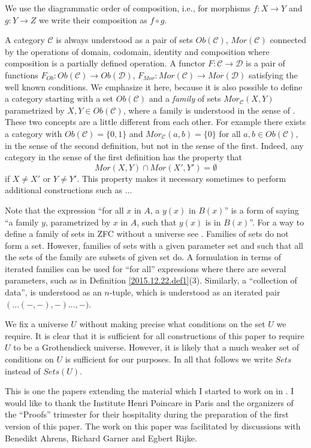 \documentclass[12pt]{amsart}
\newcommand{\sr}{\rightarrow}
\newcommand{\C}{{\mathcal C}}
\newcommand{\D}{{\mathcal D}}
\begin{document}
We use the diagrammatic order of composition, i.e., for morphisms $f:X\sr Y$
and $g:Y\sr Z$ we write their composition as $f\circ g$.

A category $\C$ is always understood as a pair of sets $Ob(\C)$, $Mor(\C)$
connected by the operations of domain, codomain, identity and composition where
composition is a partially defined operation. A functor $F:\C\sr \D$ is a pair
of functions $F_{Ob}:Ob(\C)\sr Ob(\D)$, $F_{Mor}:Mor(\C)\sr Mor(\D)$ satisfying
the well known conditions. We emphasize it here, because it is also possible to
define a category starting with a set $Ob(\C)$ and a {\em family} of sets
$Mor_{\C}(X,Y)$ parametrized by $X,Y\in Ob(\C)$, where a {family} is understood
in the sense of \cite[Remark 3.9]{fromunivwithPiI}. These two concepts are a
little different from each other. For example there exists a category with
$Ob(\C)=\{0,1\}$ and $Mor_{\C}(a,b)=\{0\}$ for all $a,b\in Ob(\C)$, in the
sense of the second definition, but not in the sense of the first. Indeed, any
category in the sense of the first definition has the property that
%
$$Mor(X,Y)\cap Mor(X',Y')=\emptyset$$
%
if $X\ne X'$ or $Y\ne Y'$. This property makes it necessary sometimes to
perform additional constructions such as ...

Note that the expression ``for all $x$ in $A$, a $y(x)$ in $B(x)$'' is a form
of saying ``a family $y$, parametrized by $x$ in $A$, such that $y(x)$ is in
$B(x)$''. For a way to define a family of sets in ZFC without a universe
see \cite[Remark 3.9]{fromunivwithPiI}. Families of sets do not form a
set. However, families of sets with a given parameter set and such that all the
sets of the family are subsets of given set do. A formulation in terms of
iterated families can be used for ``for all'' expressions where there are
several parameters, such as in Definition \ref{2015.12.22.def1}(3). Similarly, a
``collection of data'', is understood as an $n$-tuple, which is understood as
an iterated pair $(\dots(-,-),-)\dots,-)$.

We fix a universe $U$ without making precise what conditions on the set $U$ we
require. It is clear that it is sufficient for all constructions of this paper
to require $U$ to be a Grothendieck universe. However, it is likely that a much
weaker set of conditions on $U$ is sufficient for our purposes. In all that
follows we write $Sets$ instead of $Sets(U)$.

This is one the papers extending the material which I started to work on in
\cite{NTS}. I would like to thank the Institute Henri Poincare in Paris and the
organizers of the ``Proofs'' trimester for their hospitality during the
preparation of the first version of this paper. The work on this paper was
facilitated by discussions with Benedikt Ahrens, Richard Garner and Egbert
Rijke.
\end{document}
